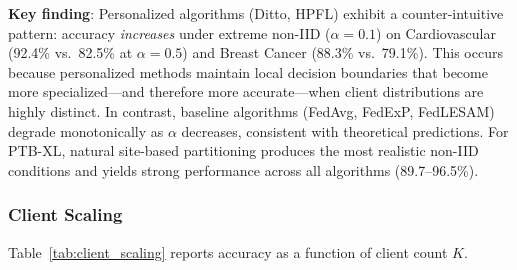 \documentclass[conference]{IEEEtran}
\begin{document}
\textbf{Key finding}: Personalized algorithms (Ditto, HPFL) exhibit a counter-intuitive pattern: accuracy \textit{increases} under extreme non-IID ($\alpha{=}0.1$) on Cardiovascular (92.4\% vs.\ 82.5\% at $\alpha{=}0.5$) and Breast Cancer (88.3\% vs.\ 79.1\%). This occurs because personalized methods maintain local decision boundaries that become more specialized---and therefore more accurate---when client distributions are highly distinct. In contrast, baseline algorithms (FedAvg, FedExP, FedLESAM) degrade monotonically as $\alpha$ decreases, consistent with theoretical predictions. For PTB-XL, natural site-based partitioning produces the most realistic non-IID conditions and yields strong performance across all algorithms (89.7--96.5\%).

\subsubsection{Client Scaling}

Table~\ref{tab:client_scaling} reports accuracy as a function of client count $K$.
\end{document}
